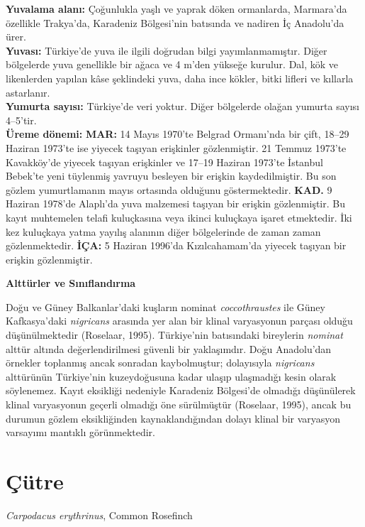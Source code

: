 \documentclass[
  10.5pt,
  a4paper,
  DIV=11,
  numbers=noendperiod,
  twocolumn]{scrreprt}
\begin{document}
\textbf{Yuvalama alanı:} Çoğunlukla yaşlı ve yaprak döken ormanlarda,
Marmara'da özellikle Trakya'da, Karadeniz Bölgesi'nin batısında ve
nadiren İç Anadolu'da ürer.\\
\textbf{Yuvası:} Türkiye'de yuva ile ilgili doğrudan bilgi
yayımlanmamıştır. Diğer bölgelerde yuva genellikle bir ağaca ve 4 m'den
yükseğe kurulur. Dal, kök ve likenlerden yapılan kâse şeklindeki yuva,
daha ince kökler, bitki lifleri ve kıllarla astarlanır.\\
\textbf{Yumurta sayısı:} Türkiye'de veri yoktur. Diğer bölgelerde olağan
yumurta sayısı 4--5'tir.\\
\textbf{Üreme dönemi:} \textbf{MAR:} 14 Mayıs 1970'te Belgrad Ormanı'nda
bir çift, 18--29 Haziran 1973'te ise yiyecek taşıyan erişkinler
gözlenmiştir. 21 Temmuz 1973'te Kavakköy'de yiyecek taşıyan erişkinler
ve 17--19 Haziran 1973'te İstanbul Bebek'te yeni tüylenmiş yavruyu
besleyen bir erişkin kaydedilmiştir. Bu son gözlem yumurtlamanın mayıs
ortasında olduğunu göstermektedir. \textbf{KAD.} 9 Haziran 1978'de
Alaplı'da yuva malzemesi taşıyan bir erişkin gözlenmiştir. Bu kayıt
muhtemelen telafi kuluçkasına veya ikinci kuluçkaya işaret etmektedir.
İki kez kuluçkaya yatma yayılış alanının diğer bölgelerinde de zaman
zaman gözlenmektedir. \textbf{İÇA:} 5 Haziran 1996'da Kızılcahamam'da
yiyecek taşıyan bir erişkin gözlenmiştir.

\textbf{Alttürler ve Sınıflandırma}

Doğu ve Güney Balkanlar'daki kuşların nominat \emph{coccothraustes} ile
Güney Kafkasya'daki \emph{nigricans} arasında yer alan bir klinal
varyasyonun parçası olduğu düşünülmektedir (Roselaar, 1995). Türkiye'nin
batısındaki bireylerin \emph{nominat} alttür altında değerlendirilmesi
güvenli bir yaklaşımdır. Doğu Anadolu'dan örnekler toplanmış ancak
sonradan kaybolmuştur; dolayısıyla \emph{nigricans} alttürünün
Türkiye'nin kuzeydoğusuna kadar ulaşıp ulaşmadığı kesin olarak
söylenemez. Kayıt eksikliği nedeniyle Karadeniz Bölgesi'de olmadığı
düşünülerek klinal varyasyonun geçerli olmadığı öne sürülmüştür
(Roselaar, 1995), ancak bu durumun gözlem eksikliğinden
kaynaklandığından dolayı klinal bir varyasyon varsayımı mantıklı
görünmektedir.

\section{Çütre}\label{uxe7uxfctre}

\emph{Carpodacus erythrinus}, Common Rosefinch
\end{document}
